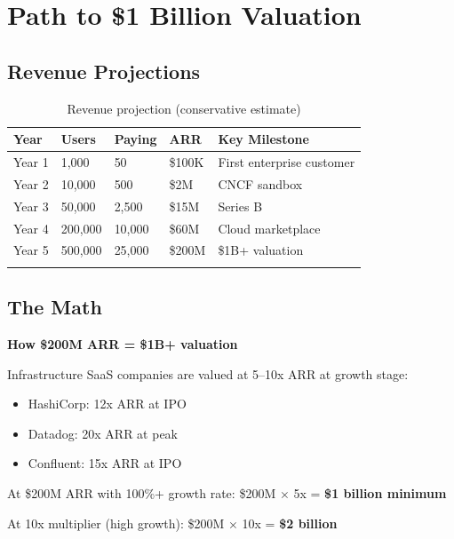 \documentclass[12pt,a4paper,openany]{report}
\begin{document}
\chapter{Path to \$1 Billion Valuation}

\section{Revenue Projections}

\begin{longtable}{p{2cm}p{2.5cm}p{2.5cm}p{2.5cm}p{3.5cm}}
\toprule
\textbf{Year} & \textbf{Users} & \textbf{Paying} & \textbf{ARR} & \textbf{Key Milestone} \\
\midrule
Year 1 & 1,000 & 50 & \$100K & First enterprise customer \\
Year 2 & 10,000 & 500 & \$2M & CNCF sandbox \\
Year 3 & 50,000 & 2,500 & \$15M & Series B \\
Year 4 & 200,000 & 10,000 & \$60M & Cloud marketplace \\
Year 5 & 500,000 & 25,000 & \$200M & \$1B+ valuation \\
\bottomrule
\caption{Revenue projection (conservative estimate)}
\end{longtable}

\section{The Math}

\begin{keyconceptbox}
\textbf{How \$200M ARR = \$1B+ valuation}

Infrastructure SaaS companies are valued at 5--10x ARR at growth stage:
\begin{itemize}
    \item HashiCorp: 12x ARR at IPO
    \item Datadog: 20x ARR at peak
    \item Confluent: 15x ARR at IPO
\end{itemize}

At \$200M ARR with 100\%+ growth rate: \$200M $\times$ 5x = \textbf{\$1 billion minimum}

At 10x multiplier (high growth): \$200M $\times$ 10x = \textbf{\$2 billion}
\end{keyconceptbox}
\end{document}
